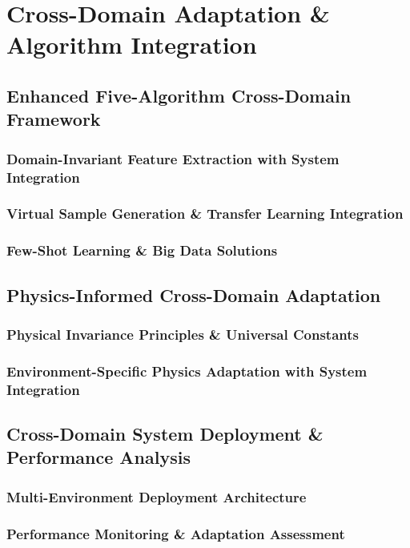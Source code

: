 \documentclass[journal]{IEEEtran}
\begin{document}
{%
\section{Cross-Domain Adaptation \& Algorithm Integration}
\label{sec:cross_domain}

\subsection{Enhanced Five-Algorithm Cross-Domain Framework}
\subsubsection{Domain-Invariant Feature Extraction with System Integration}
\subsubsection{Virtual Sample Generation \& Transfer Learning Integration}
\subsubsection{Few-Shot Learning \& Big Data Solutions}

\subsection{Physics-Informed Cross-Domain Adaptation}
\subsubsection{Physical Invariance Principles \& Universal Constants}
\subsubsection{Environment-Specific Physics Adaptation with System Integration}

\subsection{Cross-Domain System Deployment \& Performance Analysis}
\subsubsection{Multi-Environment Deployment Architecture}
\subsubsection{Performance Monitoring \& Adaptation Assessment}
}
\end{document}
